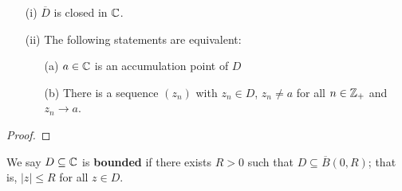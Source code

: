 \documentclass[a4paper]{report}
\begin{document}
\begin{lemma}
    \begin{enumerate}
        \item[(i)] \( \overline{D} \) is closed in \( \mathbb{C}  \).
        \item[(ii)] The following statements are equivalent:
            \begin{enumerate}
                \item[(a)] \( a \in \mathbb{C}  \) is an accumulation point of \( D  \)
                \item[(b)] There is a sequence \( ({z}_{n}) \) with \( {z}_{n} \in D  \), \( {z}_{n} \neq a  \) for all \( n \in {\ensuremath{\mathbb{Z}}}_{+} \) and \( {z}_{n} \to a  \).
            \end{enumerate}
    \end{enumerate}
\end{lemma}

\begin{proof}

\end{proof}

\begin{definition}[Bounded]
    We say \( D \subseteq \mathbb{C}  \) is \textbf{bounded} if there exists \( R > 0  \) such that \( D \subseteq \overline{B}(0,R) \); that is, \( | z  |  \leq R  \) for all \( z \in D  \).
\end{definition}
\end{document}
